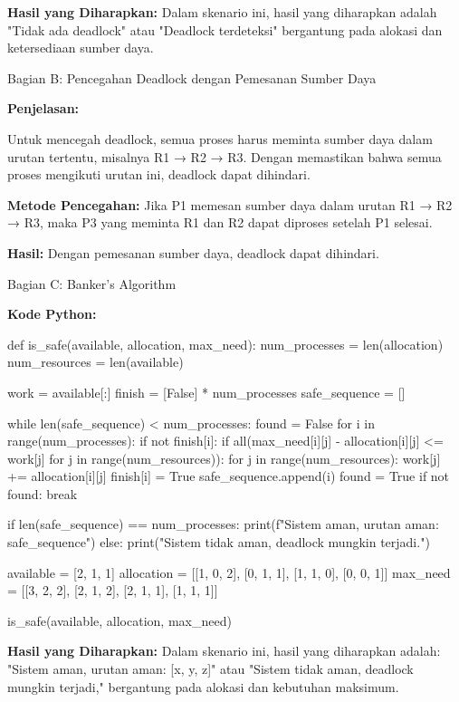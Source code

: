 \documentclass[12pt]{article}
\begin{document}
\textbf{Hasil yang Diharapkan:} Dalam skenario ini, hasil yang diharapkan adalah "Tidak ada deadlock" atau "Deadlock terdeteksi" bergantung pada alokasi dan ketersediaan sumber daya.

Bagian B: Pencegahan Deadlock dengan Pemesanan Sumber Daya

\textbf{Penjelasan:}

Untuk mencegah deadlock, semua proses harus meminta sumber daya dalam urutan tertentu, misalnya R1 → R2 → R3. Dengan memastikan bahwa semua proses mengikuti urutan ini, deadlock dapat dihindari.

\textbf{Metode Pencegahan:}
Jika P1 memesan sumber daya dalam urutan R1 → R2 → R3, maka P3 yang meminta R1 dan R2 dapat diproses setelah P1 selesai.

\textbf{Hasil:}
Dengan pemesanan sumber daya, deadlock dapat dihindari.

Bagian C: Banker's Algorithm

\textbf{Kode Python:}

\begin{python}
def is_safe(available, allocation, max_need):
    num_processes = len(allocation)
    num_resources = len(available)
    
    work = available[:]
    finish = [False] * num_processes
    safe_sequence = []

    while len(safe_sequence) < num_processes:
        found = False
        for i in range(num_processes):
            if not finish[i]:
                if all(max_need[i][j] - allocation[i][j] <= work[j] for j in range(num_resources)):
                    for j in range(num_resources):
                        work[j] += allocation[i][j]
                    finish[i] = True
                    safe_sequence.append(i)
                    found = True
        if not found:
            break

    if len(safe_sequence) == num_processes:
        print(f"Sistem aman, urutan aman: {safe_sequence}")
    else:
        print("Sistem tidak aman, deadlock mungkin terjadi.")

available = [2, 1, 1]
allocation = [[1, 0, 2], [0, 1, 1], [1, 1, 0], [0, 0, 1]]
max_need = [[3, 2, 2], [2, 1, 2], [2, 1, 1], [1, 1, 1]]

is_safe(available, allocation, max_need)
\end{python}

\textbf{Hasil yang Diharapkan:} Dalam skenario ini, hasil yang diharapkan adalah: "Sistem aman, urutan aman: [x, y, z]" atau "Sistem tidak aman, deadlock mungkin terjadi," bergantung pada alokasi dan kebutuhan maksimum.
\end{document}
